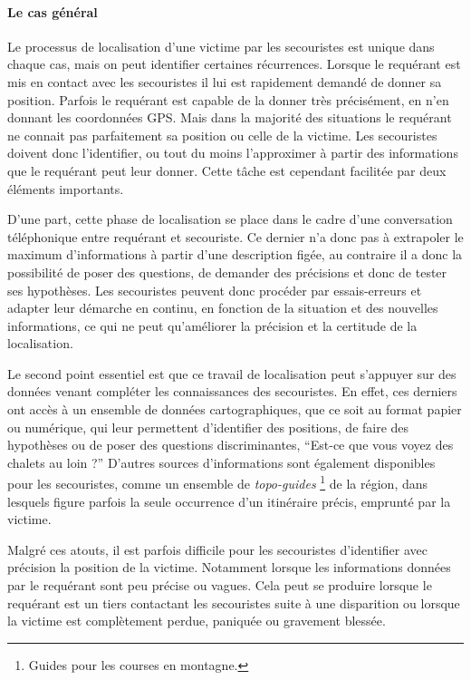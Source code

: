 \paragraph{Le cas général}

Le processus de localisation d'une victime par les secouristes est
unique dans chaque cas, mais on peut identifier certaines
récurrences. Lorsque le requérant est mis en contact avec les
secouristes il lui est rapidement demandé de donner sa
position. Parfois le requérant est capable de la donner très
précisément, \eg en n'en donnant les coordonnées GPS. Mais dans la
majorité des situations le requérant ne connait pas parfaitement sa
position ou celle de la victime. Les secouristes doivent donc
l'identifier, ou tout du moins l'approximer à partir des informations
que le requérant peut leur donner. Cette tâche est cependant facilitée
par deux éléments importants.

D'une part, cette phase de localisation se place dans le cadre d'une
conversation téléphonique entre requérant et secouriste. Ce dernier
n'a donc pas à extrapoler le maximum d'informations à partir d'une
description figée, au contraire il a donc la possibilité de poser des
questions, de demander des précisions et donc de tester ses
hypothèses. Les secouristes peuvent donc procéder par essais-erreurs
et adapter leur démarche en continu, en fonction de la situation et
des nouvelles informations, ce qui ne peut qu'améliorer la précision
et la certitude de la localisation.

Le second point essentiel est que ce travail de localisation peut
s'appuyer sur des données venant compléter les connaissances des
secouristes. En effet, ces derniers ont accès à un ensemble de données
cartographiques, que ce soit au format papier ou numérique, qui leur
permettent d'identifier des positions, de faire des hypothèses ou de
poser des questions discriminantes, \eg \enquote{Est-ce que vous voyez
  des chalets au loin ?} D'autres sources d'informations sont
également disponibles pour les secouristes, comme un ensemble de
\emph{topo-guides} \footnote{Guides pour les courses en montagne.} de
la région, dans lesquels figure parfois la seule occurrence d'un
itinéraire précis, emprunté par la victime. 

Malgré ces atouts, il est parfois difficile pour les secouristes
d'identifier avec précision la position de la victime. Notamment
lorsque les informations données par le requérant sont peu précise ou
vagues. Cela peut se produire lorsque le requérant est un tiers
contactant les secouristes suite à une disparition ou lorsque la
victime est complètement perdue, paniquée ou gravement blessée.


